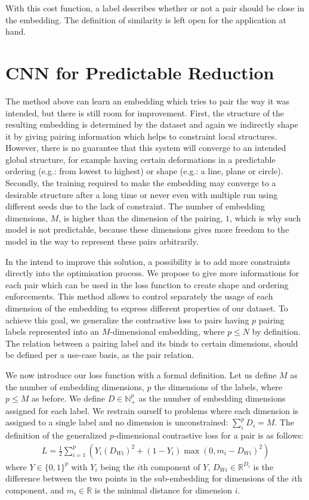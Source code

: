 \documentclass[a4paper,12pt]{report}
\newcommand{\N}{\mathbb{N}}
\newcommand{\R}{\mathbb{R}}
\newcommand{\eg}{e.g.}
\begin{document}
With this cost function, a label describes whether or not a pair should be close in the embedding.
The definition of similarity is left open for the application at hand.

\section{CNN for Predictable Reduction}
The method above can learn an embedding which tries to pair the way it was intended, but there is still room for improvement.
First, the structure of the resulting embedding is determined by the dataset and again we indirectly shape it by giving pairing information which helps to constraint local structures.
However, there is no guarantee that this system will converge to an intended global structure, for example having certain deformations in a predictable ordering (\eg: from lowest to highest) or shape (\eg: a line, plane or circle).
Secondly, the training required to make the embedding may converge to a desirable structure after a long time or never even with multiple run using different seeds due to the lack of constraint.
The number of embedding dimensions, $M$, is higher than the dimension of the pairing, $1$, which is why such model is not predictable, because these dimensions gives more freedom to the model in the way to represent these pairs arbitrarily.

In the intend to improve this solution, a possibility is to add more constraints directly into the optimisation process.
We propose to give more informations for each pair which can be used in the loss function to create shape and ordering enforcements.
This method allows to control separately the usage of each dimension of the embedding to express different properties of our dataset.
To achieve this goal, we generalize the contrastive loss to pairs having $p$ pairing labels represented into an $M$-dimensional embedding, where $p \leq N$ by definition.
The relation between a pairing label and its binds to certain dimensions, should be defined per a use-case basis, as the pair relation.

We now introduce our loss function with a formal definition.
Let us define $M$ as the number of embedding dimensions, $p$ the dimensions of the labels, where $p \leq M$ as before.
We define $D \in \N_+^p$ as the number of embedding dimensions assigned for each label.
We restrain ourself to problems where each dimension is assigned to a single label and no dimension is unconstrained: $\sum_i^p D_i = M$.
The definition of the generalized $p$-dimensional contrastive loss for a pair is as follows:
\begin{eqnarray}
    L = \frac{1}{2} \sum_{i=1}^p \left( Y_i (D_{Wi})^2 + (1-Y_i) \max(0, m_i - D_{Wi})^2 \right)
\end{eqnarray}
where $Y \in \{0,1\}^p$ with $Y_i$ being the $i$th component of $Y$, $D_{Wi} \in \R^{D_i}$ is the difference between the two points in the sub-embedding for dimensions of the $i$th component, and $m_i \in \R$ is the minimal distance for dimension $i$.
\end{document}
